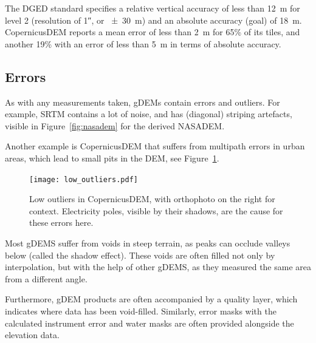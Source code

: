 %

The DGED standard specifies a relative vertical accuracy of less than \qty{12}{m} for level 2 (resolution of \ang{;;1}, or \qty{\pm30}{m}) and an absolute accuracy (goal) of \qty{18}{m}.
CopernicusDEM reports a mean error of less than \qty{2}{m} for 65\% of its tiles, and another 19\% with an error of less than \qty{5}{m} in terms of absolute accuracy.


\subsection{Errors}

As with any measurements taken, gDEMs contain errors and outliers.
For example, SRTM contains a lot of noise, and has (diagonal) striping artefacts, visible in Figure~\ref{fig:nasadem} for the derived NASADEM\@.

%

Another example is CopernicusDEM that suffers from multipath errors in urban areas, which lead to small pits in the DEM, see Figure~\ref{fig:copernicus_error}.
\begin{figure}
  \centering
  \texttt{[image: low\_outliers.pdf]}
  \caption{Low outliers in CopernicusDEM, with orthophoto on the right for context. Electricity poles, visible by their shadows, are the cause for these errors here.}%
  \label{fig:copernicus_error}
\end{figure}

%

Most gDEMS suffer from voids in steep terrain, as peaks can occlude valleys below (called the shadow effect).
These voids are often filled not only by interpolation, but with the help of other gDEMS, as they measured the same area from a different angle.

%

Furthermore, gDEM products are often accompanied by a quality layer, which indicates where data has been void-filled.
Similarly, error masks with the calculated instrument error and water masks are often provided alongside the elevation data.





